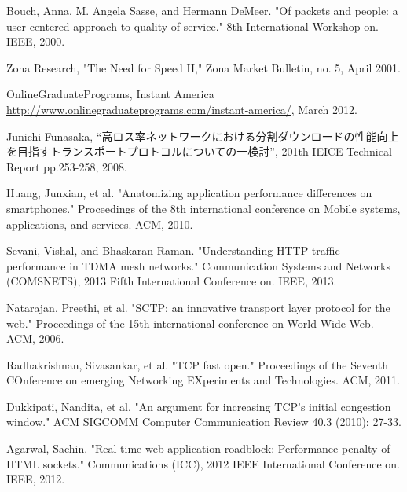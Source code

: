 \documentclass[twocolumn]{jsarticle}
\begin{document}
\begin{thebibliography}{99}
\begin{spacing}{0.7}
{\item Bouch, Anna, M. Angela Sasse, and Hermann DeMeer. "Of packets and people:
a user-centered approach to quality of service."  8th International Workshop on.
IEEE, 2000.
\label{bib:Bouch}

\item Zona Research, "The Need for Speed II," Zona Market Bulletin, no. 5, April
2001.
\label{beb:Zona}

\item OnlineGraduatePrograms, Instant America
\url{http://www.onlinegraduateprograms.com/instant-america/}, March 2012.
\label{bib:Instant}

\item Junichi Funasaka, ``高ロス率ネットワークにおける分割ダウンロードの性能向上を目指すトランスポートプロトコルについての一検討'',
201th IEICE Technical Report pp.253-258, 2008.
\label{bib:Junichi}

\item Huang, Junxian, et al. "Anatomizing application performance differences on
smartphones." Proceedings of the 8th international conference on Mobile systems, applications, and services. ACM, 2010.
\label{bib:Huang}

\item Sevani, Vishal, and Bhaskaran Raman. "Understanding HTTP traffic
performance in TDMA mesh networks." Communication Systems and Networks (COMSNETS), 2013 Fifth International Conference on. IEEE, 2013.
\label{bib:Sevani}

\item Natarajan, Preethi, et al. "SCTP: an innovative transport layer protocol
for the web." Proceedings of the 15th international conference on World Wide Web. ACM, 2006.
\label{bib:Natarajan}

\item Radhakrishnan, Sivasankar, et al. "TCP fast open." Proceedings of the
Seventh COnference on emerging Networking EXperiments and Technologies. ACM, 2011.
\label{bib:Radhakrishnan}

\item Dukkipati, Nandita, et al. "An argument for increasing TCP’s initial
congestion window." ACM SIGCOMM Computer Communication Review 40.3 (2010): 27-33.
\label{bib:Dukkipati}

\item Agarwal, Sachin. "Real-time web application roadblock: Performance penalty
of HTML sockets." Communications (ICC), 2012 IEEE International Conference on. IEEE, 2012.
\label{bib:Agarwal}

}
\end{spacing}
\end{thebibliography}
\end{document}
